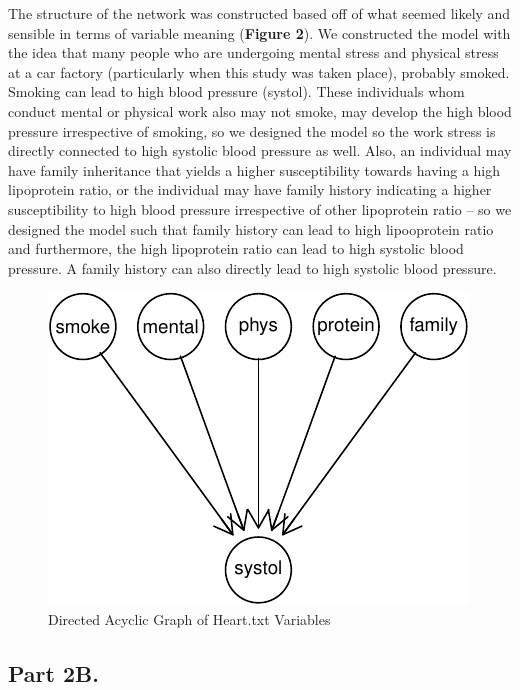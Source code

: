 \documentclass[]{article}
\begin{document}
The structure of the network was constructed based off of what seemed
likely and sensible in terms of variable meaning (\textbf{Figure 2}). We
constructed the model with the idea that many people who are undergoing
mental stress and physical stress at a car factory (particularly when
this study was taken place), probably smoked. Smoking can lead to high
blood pressure (systol). These individuals whom conduct mental or
physical work also may not smoke, may develop the high blood pressure
irrespective of smoking, so we designed the model so the work stress is
directly connected to high systolic blood pressure as well. Also, an
individual may have family inheritance that yields a higher
susceptibility towards having a high lipoprotein ratio, or the
individual may have family history indicating a higher susceptibility to
high blood pressure irrespective of other lipoprotein ratio -- so we
designed the model such that family history can lead to high
lipooprotein ratio and furthermore, the high lipoprotein ratio can lead
to high systolic blood pressure. A family history can also directly lead
to high systolic blood pressure.

\begin{figure}[h]

{\centering \includegraphics{stat546_hw4_files/figure-latex/unnamed-chunk-5-1} 

}

\caption{Directed Acyclic Graph of Heart.txt Variables}\label{fig:unnamed-chunk-5}
\end{figure}

\subsection{Part 2B.}\label{part-2b.}
\end{document}
